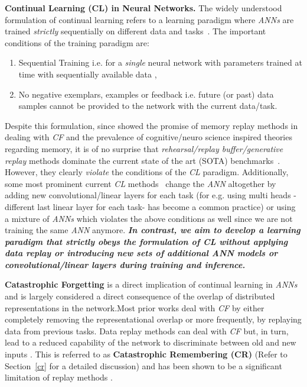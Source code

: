 \documentclass{article}
\begin{document}
\textbf{Continual Learning (CL) in Neural Networks.} \label{cl}The widely understood formulation of continual learning
refers to a learning paradigm where \textit{ANNs} are trained \textit{strictly} sequentially on different data and tasks~\cite{chen2018lifelong, mundt2020wholistic}. The important conditions of the training paradigm are:
\begin{enumerate}[topsep=0pt,itemsep=-1ex,partopsep=1ex,parsep=1ex]
    \item Sequential Training i.e. for a \textit{single} neural network  with parameters  trained at time  with sequentially available data ,\\
        
    \item No negative exemplars, examples or feedback i.e. future (or past) data samples cannot be provided to the network with the current data/task.\\
    
\end{enumerate}
Despite this formulation, since \cite{robins_catastrophic_1993} showed the promise of memory replay methods in dealing with \textit{CF} and the prevalence of cognitive/neuro science inspired theories regarding memory, it is of no surprise that \textit{rehearsal/replay buffer/generative replay} methods dominate the current state of the art (SOTA) benchmarks~\cite{titsias2019functional, fear17, pan2021continual, lee_continual_2020}. However, they clearly \textit{violate} the conditions of the \textit{CL} paradigm. Additionally, some most prominent current \textit{CL} methods~\cite{Serr2018OvercomingCF, lee_continual_2020, guo2020improved, yoo_snow_2020} change the \textit{ANN} altogether by adding new convolutional/linear layers for each task (for e.g. using multi heads -different last linear layer for each task- has become a common practice) or using a mixture of \textit{ANNs} which violates the above conditions as well since we are not training the same \textit{ANN}  anymore. \textbf{\textit{In contrast, we aim to develop a learning paradigm that strictly obeys the formulation of CL without applying data replay or introducing new sets of additional ANN models or convolutional/linear layers during training and inference.}}

\textbf{Catastrophic Forgetting} is a direct implication of continual learning in \textit{ANNs} and is largely considered a direct consequence of the overlap of distributed representations in the network.Most prior works deal with \textit{CF} by either completely removing the representational overlap \cite{French1991, kirkpatrick2017overcoming} or more frequently, 
by replaying data from previous tasks.
Data replay methods can deal with \textit{CF} but, in turn, lead to a reduced capability of the network to 
discriminate between old and new inputs \cite{doi:10.1080/09540099550039264}. This is referred to as \textbf{Catastrophic Remembering (CR)} (Refer to Section~\ref{cr} for a detailed discussion) and 
has been shown to be a significant limitation of replay methods \cite{robins_catastrophic_1993,doi:10.1080/09540099550039264}.
\end{document}
